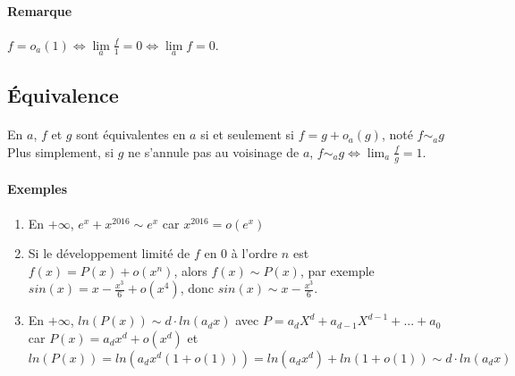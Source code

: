 \documentclass[]{article}
\begin{document}
\paragraph{Remarque}
$f=o_a(1) \Longleftrightarrow \lim\limits_{a} \frac{f}{1} = 0 \Longleftrightarrow \lim\limits_{a} f = 0$.

\subsection{Équivalence}

\paragraph[Définition]{}
En $a$, $f$ et $g$ sont équivalentes en $a$ si et seulement si $f=g+o_a(g)$, noté $f \sim_a g$
Plus simplement, si $g$ ne s'annule pas au voisinage de $a$, $\displaystyle f \sim_a g \Leftrightarrow \lim_a \frac{f}{g}=1$.

\paragraph{Exemples}
\begin{enumerate}
	\item En $+ \infty$, $e^x + x^{2016} \sim e^x$ car $x^{2016}=o(e^x)$
	
	\item Si le développement limité de $f$ en $0$ à l'ordre $n$ est $f(x)=P(x)+o(x^n)$, alors $f(x) \sim P(x)$, par exemple $sin(x)=x-\frac{x^3}{6}+o(x^4)$, donc $sin(x) \sim x-\frac{x^3}{6}$.
	
	\item En $+\infty$, $ln(P(x)) \sim d \cdot ln(a_dx)$ avec $P = a_d X^d + a_{d-1}X^{d-1} + ... + a_0$ car $P(x) = a_d x^d + o(x^d)$ et $ln(P(x))=ln(a_d x^d(1+o(1)))=ln(a_dx^d)+ln(1+o(1)) \sim d \cdot ln(a_d x)$
\end{enumerate}
\end{document}
